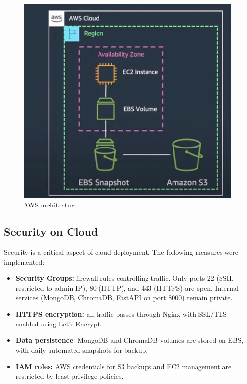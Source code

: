 \begin{center}
\begin{figure}[H]
\centering
\includegraphics[scale=0.45]{images/AWS_architecture.png}
\caption{AWS architecture}
\label{fig:AWS_arch}
\end{figure}
\end{center}


\subsection{Security on Cloud}
Security is a critical aspect of cloud deployment. The following
measures were implemented:
\begin{itemize}
    \item \textbf{Security Groups:} firewall rules controlling traffic. Only
    ports 22 (SSH, restricted to admin IP), 80 (HTTP), and 443 (HTTPS)
    are open. Internal services (MongoDB, ChromaDB, FastAPI on port
    8000) remain private.
    \item \textbf{HTTPS encryption:} all traffic passes through Nginx with
    SSL/TLS enabled using Let’s Encrypt.
    \item \textbf{Data persistence:} MongoDB and ChromaDB volumes are
    stored on EBS, with daily automated snapshots for backup.
    \item \textbf{IAM roles:} AWS credentials for S3 backups and EC2
    management are restricted by least-privilege policies.
\end{itemize}

